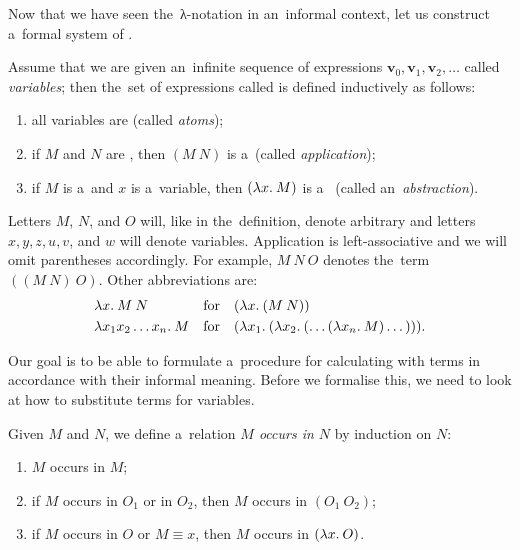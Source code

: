 Now that we have seen the~λ-notation in an~informal context, let us
construct a~formal system of \lc.
\begin{definition}\label{def:lambda_calculus}
  Assume that we are given an~infinite sequence of expressions $\mathbf{v}_0,
  \mathbf{v}_1, \mathbf{v}_2, \dots$ called \emph{variables}; then the~set of
  expressions called \emph{\lts} is defined inductively as follows:
  \begin{enumerate}
    \item all variables are \lts (called \emph{atoms});
    \item if $M$ and $N$ are \lts, then $(M \: N)$ is a~\lt (called
      \emph{application});
    \item if $M$ is a~\lt and $x$ is a~variable, then $(\lambda x . \: M)$ is a~\lt
      (called an~\emph{abstraction}).
  \end{enumerate}
\end{definition}
Letters $M$, $N$, and $O$ will, like in the~definition, denote arbitrary \lts
and letters $x, y, z, u, v$, and $w$ will denote variables. Application is
left-associative and we will omit parentheses accordingly. For example,
$M \: N \: O$ denotes the~term $((M \: N) \: O)$. Other abbreviations are:
\begin{align*}
  &{\lambda x . \: M \: N}  &  &\text{for}  &  &(\lambda x . \: (M \: N)) \\
  &{\lambda x_1 x_2 \dots x_n . \: M}  &  &\text{for}  &
    &(\lambda x_1 . \: (\lambda x_2 . \: ( \dots (\lambda x_n . \: M) \dots ))).
\end{align*}


Our goal is to be able to formulate a~procedure for calculating with terms in
accordance with their informal meaning. Before we formalise this, we need to
look at how to substitute terms for variables.

\begin{definition}
  Given \lts $M$ and $N$, we define a~relation \emph{$M$ occurs in $N$} by
  induction on $N$:
  \begin{enumerate}
    \item $M$ occurs in $M$;
    \item if $M$ occurs in $O_1$ or in $O_2$, then $M$ occurs in $(O_1 \: O_2)$;
    \item if $M$ occurs in $O$ or $M \equiv x$, then $M$ occurs in $(\lambda x . \: O)$.
  \end{enumerate}
\end{definition}

